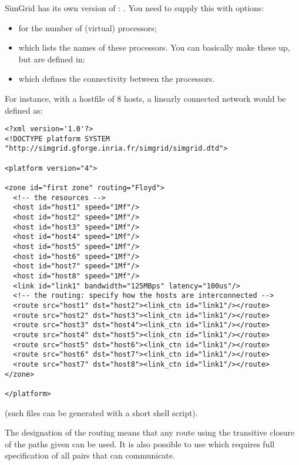 SimGrid has its own version of : . You
need to supply this with options:
\begin{itemize}
\item {} for the number of (virtual) processors;
\item {} which lists the names of these
  processors. You can basically make these up, but are defined in:
\item {} which defines the connectivity between
  the processors.
\end{itemize}
For instance, with a hostfile of 8 hosts, a linearly connected network
would be defined as:
\begin{verbatim}
<?xml version='1.0'?>
<!DOCTYPE platform SYSTEM "http://simgrid.gforge.inria.fr/simgrid/simgrid.dtd">

<platform version="4">

<zone id="first zone" routing="Floyd">
  <!-- the resources -->
  <host id="host1" speed="1Mf"/>
  <host id="host2" speed="1Mf"/>
  <host id="host3" speed="1Mf"/>
  <host id="host4" speed="1Mf"/>
  <host id="host5" speed="1Mf"/>
  <host id="host6" speed="1Mf"/>
  <host id="host7" speed="1Mf"/>
  <host id="host8" speed="1Mf"/>
  <link id="link1" bandwidth="125MBps" latency="100us"/>
  <!-- the routing: specify how the hosts are interconnected -->
  <route src="host1" dst="host2"><link_ctn id="link1"/></route>
  <route src="host2" dst="host3"><link_ctn id="link1"/></route>
  <route src="host3" dst="host4"><link_ctn id="link1"/></route>
  <route src="host4" dst="host5"><link_ctn id="link1"/></route>
  <route src="host5" dst="host6"><link_ctn id="link1"/></route>
  <route src="host6" dst="host7"><link_ctn id="link1"/></route>
  <route src="host7" dst="host8"><link_ctn id="link1"/></route>
</zone>

</platform>
\end{verbatim}
(such files can be generated with a short shell script).

The  designation of the routing means that any route using
the transitive closure of the paths given can be used.
It is also possible to use  which requires full
specification of all pairs that can communicate.


